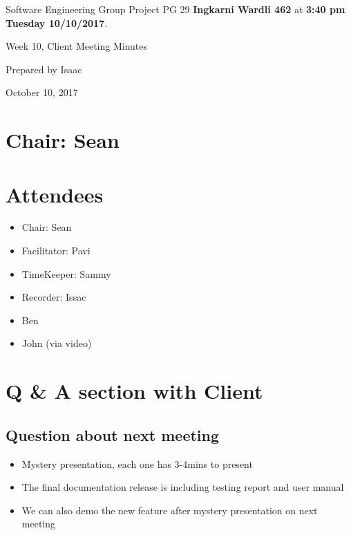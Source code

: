 \documentclass[11pt, a4paper]{article}
\begin{document}
\noindent Software Engineering Group Project PG 29 {\bf Ingkarni Wardli 462} at {\bf 3:40 pm Tuesday 10/10/2017}.
\vspace*{10pt}
\begin{center}
\huge Week 10, Client Meeting Minutes
\end{center}
\vspace*{10pt}
\begin{center}
\huge Prepared by Isaac
\end{center}
\begin{center}
\huge October 10, 2017
\end{center}
\section*{Chair: Sean}

\section{Attendees}
\begin{itemize}
\item Chair: Sean
\item Facilitator: Pavi
\item TimeKeeper: Sammy
\item Recorder: Issac
\item Ben
\item John (via video)
\end{itemize}



\section{Q \& A section with Client}
\subsection{Question about next meeting}
\begin{itemize}
\item Mystery presentation, each one has 3-4mins to present
\item The final documentation release is including testing report and user manual
\item We can also demo the new feature after mystery presentation on next meeting
\end{itemize}
\end{document}
